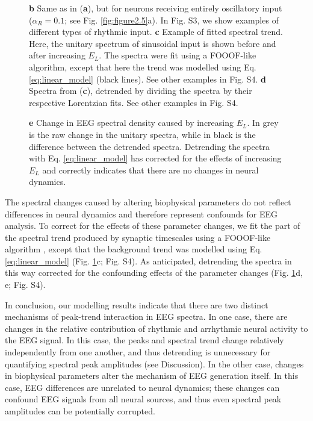 \begin{figure}
\begin{minipage}[c]{70mm}
{	\textbf{b} Same as in (\textbf{a}), but for neurons receiving entirely oscillatory input ($\alpha_R=0.1$; see Fig. \ref{fig:figure2.5}a). In Fig. S3, we show examples of different types of rhythmic input.
	\textbf{c} Example of fitted spectral trend. Here, the unitary spectrum of sinusoidal input is shown before and after increasing $E_L$. The spectra were fit using a FOOOF-like algorithm\cite{Donoghue2020}, except that here the trend was modelled using Eq. \ref{eq:linear_model} (black lines). See other examples in Fig. S4.
        \textbf{d} Spectra from (\textbf{c}), detrended by dividing the spectra by their respective Lorentzian fits. See other examples in Fig. S4. 
    } \label{fig:figure2.7}
  \end{minipage}
  \begin{minipage}[c]{\textwidth}
    \vspace*{-0.72cm} \footnotesize \singlespacing
	\textbf{e} Change in EEG spectral density caused by increasing $E_L$. In grey is the raw change in the unitary spectra, while in black is the difference between the detrended spectra. Detrending the spectra with Eq. \ref{eq:linear_model} has corrected for the effects of increasing $E_L$ and correctly indicates that there are no changes in neural dynamics. 
  \end{minipage}
\end{figure}

The spectral changes caused by altering biophysical parameters do not reflect differences in neural dynamics and therefore represent confounds for EEG analysis. To correct for the effects of these parameter changes, we fit the part of the spectral trend produced by synaptic timescales using a FOOOF-like algorithm \cite{Donoghue2020}, except that the background trend was modelled using Eq. \ref{eq:linear_model} (Fig. \ref{fig:figure2.7}c; Fig. S4). As anticipated, detrending the spectra in this way corrected for the confounding effects of the parameter changes (Fig. \ref{fig:figure2.7}d, e; Fig. S4).

In conclusion, our modelling results indicate that there are two distinct mechanisms of peak-trend interaction in EEG spectra. In one case, there are changes in the relative contribution of rhythmic and arrhythmic neural activity to the EEG signal. In this case, the peaks and spectral trend change relatively independently from one another, and thus detrending is unnecessary for quantifying spectral peak amplitudes (see Discussion). In the other case, changes in biophysical parameters alter the mechanism of EEG generation itself. In this case, EEG differences are unrelated to neural dynamics; these changes can confound EEG signals from all neural sources, and thus even spectral peak amplitudes can be potentially corrupted.


